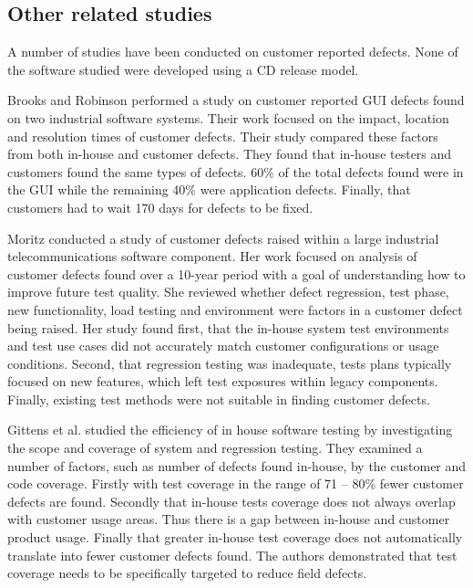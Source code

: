 \documentclass[conference]{IEEEtran}
\begin{document}
\subsection{Other related studies}
A number of studies have been conducted on customer reported defects. None of the software studied were developed using a CD  release model. \par
Brooks and Robinson \cite{brooks2009initial} performed a study on customer reported GUI defects found on two industrial software systems. Their work focused on the impact, location and resolution times of customer defects. Their study compared these factors from both in-house and customer defects. They found that in-house testers and customers found the same types of defects. 60\% of the total defects found were in the GUI while the remaining 40\% were application defects. Finally, that customers had to wait 170 days for defects to be fixed. \par
Moritz \cite{moritz2009case} conducted a study of customer defects raised within a large industrial telecommunications software component. Her work focused on analysis of customer defects found over a 10-year period with a goal of understanding how to improve future test quality. She reviewed whether defect regression, test phase, new functionality, load testing and environment were factors in a customer defect being raised. Her study found first, that the in-house system test environments and test use cases did not accurately match customer configurations or usage conditions. Second, that regression testing was inadequate, tests plans typically focused on new features,  which left test exposures within legacy components. Finally, existing test methods were not suitable in finding customer defects. \par
 Gittens et al. \cite{gittens2002empirical} studied the efficiency of in house software testing by investigating the scope and coverage of system and regression testing. They examined a number of factors, such as number of defects found in-house, by the customer and code coverage. Firstly with test coverage in the range of 71 -- 80\% fewer customer defects are found. Secondly that in-house tests coverage does not always overlap with customer usage areas. Thus there is a gap between in-house and customer product usage. Finally that greater in-house test coverage does not automatically translate into fewer customer defects found. The authors demonstrated that test coverage needs to be specifically targeted to reduce field defects. \par
\end{document}
